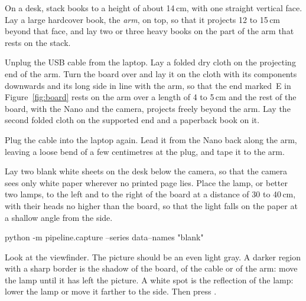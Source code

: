 On a desk, stack books to a height of about 14\,cm, with one straight vertical face. Lay a large
hardcover book, the \emph{arm}, on top, so that it projects 12 to 15\,cm beyond that face, and
lay two or three heavy books on the part of the arm that rests on the stack.

Unplug the USB cable from the laptop. Lay a folded dry cloth on the projecting end of the arm.
Turn the board over and lay it on the cloth with its components downwards and its long side in
line with the arm, so that the end marked~E in Figure~\ref{fig:board} rests on the arm over a
length of 4 to 5\,cm and the rest of the board, with the Nano and the camera, projects freely
beyond the arm. Lay the second folded cloth on the supported end and a paperback book on it.

Plug the cable into the laptop again. Lead it from the Nano back along the arm, leaving a loose
bend of a few centimetres at the plug, and tape it to the arm.

Lay two blank white sheets on the desk below the camera, so that the camera sees only white
paper wherever no printed page lies. Place the lamp, or better two lamps, to the left and to
the right of the board at a distance of 30 to 40\,cm, with their heads no higher than the
board, so that the light falls on the paper at a shallow angle from the side.
\begin{ps}
python -m pipeline.capture --series data\raw\rig --names "blank"
\end{ps}
Look at the viewfinder. The picture should be an even light gray. A darker region with a sharp
border is the shadow of the board, of the cable or of the arm: move the lamp until it has left
the picture. A white spot is the reflection of the lamp: lower the lamp or move it farther to
the side. Then press .

